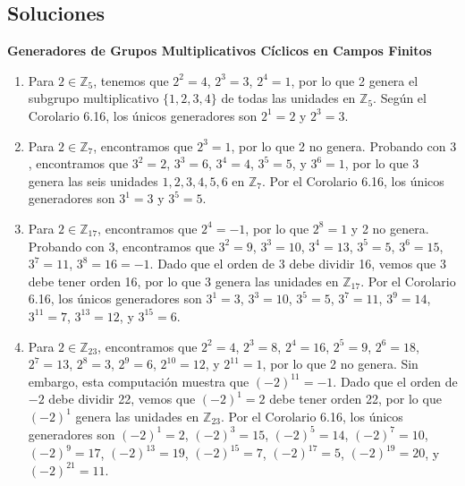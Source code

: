 \subsection*{Soluciones}


\textbf{Generadores de Grupos Multiplicativos Cíclicos en Campos Finitos}
	
\begin{enumerate}
	\item Para \(2 \in \mathbb{Z}_5\), tenemos que \(2^2 = 4\), \(2^3 = 3\), \(2^4 = 1\), por lo que 2 genera el subgrupo multiplicativo \(\{1, 2, 3, 4\}\) de todas las unidades en \(\mathbb{Z}_5\). Según el Corolario 6.16, los únicos generadores son \(2^1 = 2\) y \(2^3 = 3\).
		
	\item Para \(2 \in \mathbb{Z}_7\), encontramos que \(2^3 = 1\), por lo que 2 no genera. Probando con \(3\), encontramos que \(3^2 = 2\), \(3^3 = 6\), \(3^4 = 4\), \(3^5 = 5\), y \(3^6 = 1\), por lo que 3 genera las seis unidades \(1, 2, 3, 4, 5, 6\) en \(\mathbb{Z}_7\). Por el Corolario 6.16, los únicos generadores son \(3^1 = 3\) y \(3^5 = 5\).
		
	\item Para \(2 \in \mathbb{Z}_{17}\), encontramos que \(2^4 = -1\), por lo que \(2^8 = 1\) y 2 no genera. Probando con \(3\), encontramos que \(3^2 = 9\), \(3^3 = 10\), \(3^4 = 13\), \(3^5 = 5\), \(3^6 = 15\), \(3^7 = 11\), \(3^8 = 16 = -1\). Dado que el orden de 3 debe dividir 16, vemos que 3 debe tener orden 16, por lo que 3 genera las unidades en \(\mathbb{Z}_{17}\). Por el Corolario 6.16, los únicos generadores son \(3^1 = 3\), \(3^3 = 10\), \(3^5 = 5\), \(3^7 = 11\), \(3^9 = 14\), \(3^{11} = 7\), \(3^{13} = 12\), y \(3^{15} = 6\).
		
	\item Para \(2 \in \mathbb{Z}_{23}\), encontramos que \(2^2 = 4\), \(2^3 = 8\), \(2^4 = 16\), \(2^5 = 9\), \(2^6 = 18\), \(2^7 = 13\), \(2^8 = 3\), \(2^9 = 6\), \(2^{10} = 12\), y \(2^{11} = 1\), por lo que 2 no genera. Sin embargo, esta computación muestra que \((-2)^{11} = -1\). Dado que el orden de \(-2\) debe dividir 22, vemos que \((-2)^1 = 2\) debe tener orden 22, por lo que \((-2)^1\) genera las unidades en \(\mathbb{Z}_{23}\). Por el Corolario 6.16, los únicos generadores son \((-2)^1 = 2\), \((-2)^3 = 15\), \((-2)^5 = 14\), \((-2)^7 = 10\), \((-2)^9 = 17\), \((-2)^{13} = 19\), \((-2)^{15} = 7\), \((-2)^{17} = 5\), \((-2)^{19} = 20\), y \((-2)^{21} = 11\).
	\end{enumerate}
	
